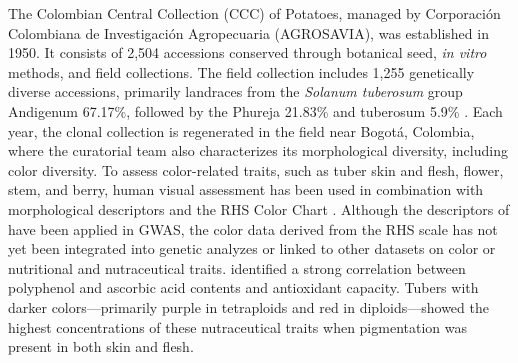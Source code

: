\documentclass[pdflatex,sn-mathphys-ay]{sn-jnl}%
\begin{document}
The Colombian Central Collection (CCC) of Potatoes, managed by Corporación Colombiana de Investigación Agropecuaria (AGROSAVIA), was established in 1950. It consists of 2,504 accessions conserved through botanical seed, \textit{in vitro} methods, and field collections. The field collection includes 1,255 genetically diverse accessions, primarily landraces from the \textit{Solanum tuberosum} group Andigenum 67.17\%, followed by the Phureja 21.83\% and tuberosum 5.9\% \citep{manrique2023defining, Berdugo2017}. Each year, the clonal collection is regenerated in the field near Bogotá, Colombia, where the curatorial team also characterizes its morphological diversity, including color diversity. To assess color-related traits, such as tuber skin and flesh, flower, stem, and berry, human visual assessment has been used in combination with morphological descriptors \citep{gomez2000guia} and the RHS Color Chart \citep{RHS2015}.  Although the descriptors of \cite{gomez2000guia} have been applied in GWAS\citep{Berdugo2017, berdugo2023phenotypic}, the color data derived from the RHS scale has not yet been integrated into genetic analyzes or linked to other datasets on color or nutritional and nutraceutical traits. \cite{berdugo2023phenotypic} identified a strong correlation between polyphenol and ascorbic acid contents and antioxidant capacity. Tubers with darker colors—primarily purple in tetraploids and red in diploids—showed the highest concentrations of these nutraceutical traits when pigmentation was present in both skin and flesh.

\end{document}
